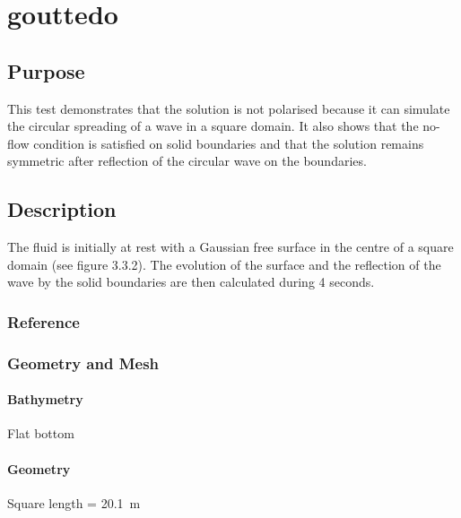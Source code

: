 \chapter{gouttedo}
%
%
\section{Purpose}
%
This test demonstrates that the  solution is not polarised
because it can simulate the circular spreading of a wave in a square
domain.
It also shows that the no-flow condition is satisfied on solid
boundaries and that the solution remains symmetric after reflection
of the circular wave on the boundaries.
%
\section{Description}
%
%
%
The fluid is initially at rest with a Gaussian free surface in the
centre of a square domain (see figure 3.3.2).
The evolution of the surface and the reflection of the wave by the
solid boundaries are then calculated during 4 seconds.
%
\subsection{Reference}
%

%
%
%
\subsection{Geometry and Mesh}
%
\subsubsection{Bathymetry}
%
Flat bottom
%
\subsubsection{Geometry}
%
Square length = 20.1~m
%

